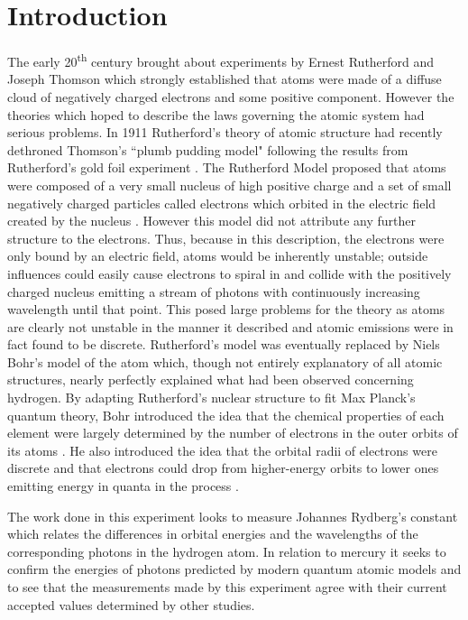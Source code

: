 \documentclass[prb,preprint]{revtex4-1}
\begin{document}
\section{Introduction}
The early 20\textsuperscript{th} century brought about experiments by Ernest Rutherford and Joseph Thomson which strongly established that atoms were made of a diffuse cloud of negatively charged electrons and some positive component. However the theories which hoped to describe the laws governing the atomic system had serious problems. In 1911 Rutherford's theory of atomic structure had recently dethroned Thomson's ``plumb pudding model" following the results from Rutherford's gold foil experiment \cite{geiger}. The Rutherford Model proposed that atoms were composed of a very small nucleus of high positive charge and a set of small negatively charged particles called electrons which orbited in the electric field created by the nucleus \cite{ruth}. However this model did not attribute any further structure to the electrons. Thus, because in this description, the electrons were only bound by an electric field, atoms would be inherently unstable; outside influences could easily cause electrons to spiral in and collide with the positively charged nucleus emitting a stream of photons with continuously increasing wavelength until that point. This posed large problems for the theory as atoms are clearly not unstable in the manner it described and atomic emissions were in fact found to be discrete. Rutherford's model was eventually replaced by Niels Bohr's model of the atom which, though not entirely explanatory of all atomic structures, nearly perfectly explained what had been observed concerning hydrogen. By adapting Rutherford's nuclear structure to fit Max Planck's quantum theory, Bohr introduced the idea that the chemical properties of each element were largely determined by the number of electrons in the outer orbits of its atoms \cite{bohr1,bohr2,bohr3}. He also introduced the idea that the orbital radii of electrons were discrete and that electrons could drop from higher-energy orbits to lower ones emitting energy in quanta in the process \cite{bohr1,bohr2,bohr3}.

The work done in this experiment looks to measure Johannes Rydberg's constant which relates the differences in orbital energies and the wavelengths of the corresponding photons in the hydrogen atom. In relation to mercury it seeks to confirm the energies of photons predicted by modern quantum atomic models and to see that the measurements made by this experiment agree with their current accepted values determined by other studies.
\end{document}
